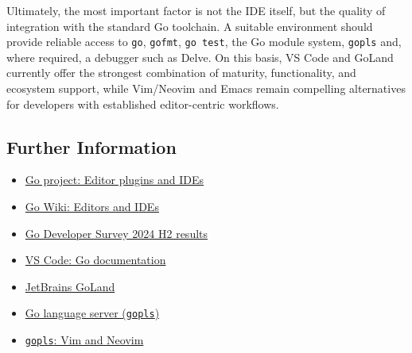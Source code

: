 Ultimately, the most important factor is not the IDE itself, but the quality of integration with the standard Go toolchain. A suitable environment should provide reliable access to \texttt{go}, \texttt{gofmt}, \texttt{go test}, the Go module system, \texttt{gopls} and, where required, a debugger such as Delve. On this basis, VS Code and GoLand currently offer the strongest combination of maturity, functionality, and ecosystem support, while Vim/Neovim and Emacs remain compelling alternatives for developers with established editor-centric workflows.

\subsection*{Further Information}

\begin{itemize}
\item \href{https://go.dev/doc/editors}{Go project: Editor plugins and IDEs}
\item \href{https://go.dev/wiki/IDEsAndTextEditorPlugins}{Go Wiki: Editors and IDEs}
\item \href{https://go.dev/blog/survey2024-h2-results}{Go Developer Survey 2024 H2 results}
\item \href{https://code.visualstudio.com/docs/languages/go}{VS Code: Go documentation}
\item \href{https://www.jetbrains.com/go/}{JetBrains GoLand}
\item \href{https://go.dev/gopls/}{Go language server (\texttt{gopls})}
\item \href{https://go.dev/gopls/editor/vim}{\texttt{gopls}: Vim and Neovim}
\end{itemize}